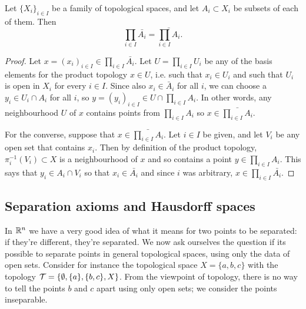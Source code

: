 \begin{prop}
  Let $\{X_i\}_{i \in I}$ be a family of topological spaces, and let $A_i \subset X_i$ be subsets of each of them. Then
  \[
    \prod_{i \in I} \bar {A_i} = \bar{\prod_{i \in I} A_i}.
  \]
\end{prop}
\begin{proof}
  Let $x = (x_i)_{i \in I} \in \prod_{i \in I} \bar {A_i}$. Let $U = \prod_{i \in I} U_i$ be any of the basis elements for the product topology $x \in U$, i.e. such that $x_i \in U_i$ and such that $U_i$ is open in $X_i$ for every $i \in I$. Since also $x_i \in \bar A_i$ for all $i$, we can choose a $y_i \in U_i \cap A_i$ for all $i$, so $y = (y_i)_{i \in I} \in U \cap \prod_{i\in I} A_i$. In other words, any neighbourhood $U$ of $x$ contains points from $\prod_{i\in I} A_i$ so $x \in \bar{\prod_{i\in I} A_i}$.
  
  For the converse, suppose that $x \in \bar{\prod_{i\in I} A_i}$. Let $i \in I$ be given, and let $V_i$ be any open set that contains $x_i$. Then by definition of the product topology, $\pi_i^{-1}(V_i)\subset X$ is a neighbourhood of $x$ and so contains a point $y \in \prod_{i\in I} A_i$. This says that $y_i \in A_i \cap V_i$ so that $x_i \in \bar{A_i}$ and since $i$ was arbitrary, $x \in \prod_{i \in I} \bar{A_i}$.
\end{proof}

\subsection{Separation axioms and Hausdorff spaces}
In $\mathbb{R}^n$ we have a very good idea of what it means for two points to be separated: if they're different, they're separated. We now ask ourselves the question if its possible to separate points in general topological spaces, using only the data of open sets. Consider for instance the topological space $X = \{a,b,c\}$ with the topology $\mathcal{T} = \{ \emptyset, \{a\}, \{b,c\} , X\}$. From the viewpoint of topology, there is no way to tell the points $b$ and $c$ apart using only open sets; we consider the points inseparable.

